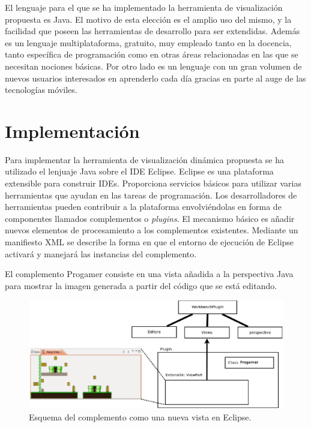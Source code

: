 \documentclass{llncs}
\begin{document}
El lenguaje para el que se ha implementado la herramienta de visualización propuesta es Java. El motivo de esta elección es el amplio uso del mismo, y la facilidad que poseen las herramientas de desarrollo para ser extendidas. Además es un lenguaje multiplataforma, gratuito, muy empleado tanto en la docencia, tanto específica de programación como en otras áreas relacionadas en las que se necesitan nociones básicas. Por otro lado es un lenguaje con un gran volumen de nuevos usuarios interesados en aprenderlo cada día gracias en parte al auge de las tecnologías móviles.




\section{Implementación}
\label{sec:details}
Para implementar la herramienta de visualización dinámica propuesta se ha utilizado el lenjuaje Java sobre el IDE Eclipse. Eclipse es una plataforma extensible para construir IDEs. Proporciona servicios básicos para utilizar varias herramientas que ayudan en las tareas de programación. Los desarrolladores de herramientas pueden contribuir a la plataforma envolviéndolas en forma de componentes llamados complementos o \emph{plugins}. El mecanismo básico es añadir nuevos elementos de procesamiento a los complementos existentes. Mediante un manifiesto XML se describe la forma en que el entorno de ejecución de Eclipse activará y manejará las instancias del complemento. 

El complemento Progamer consiste en una vista añadida a la perspectiva Java para mostrar la imagen generada a partir del código que se está editando. 

\begin{figure}[ht]
\begin{center}
\includegraphics[scale=0.35]{images/crplugin.eps}
\caption{Esquema del complemento como una nueva vista en Eclipse.
\label{fig:crplugin}}
\end{center}
\end{figure}
\end{document}
